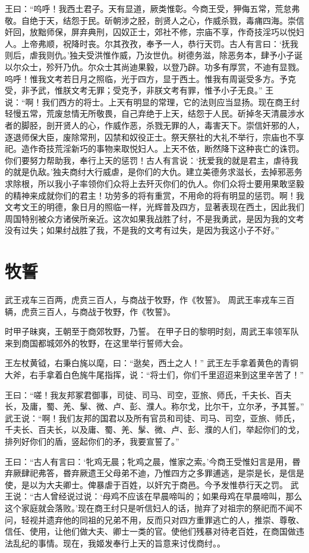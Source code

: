 \documentclass[12pt,UTF8]{ctexbook}
\begin{document}
王曰：“呜呼！我西土君子。天有显道，厥类惟彰。今商王受，狎侮五常，荒怠弗敬。自绝于天，结怨于民。斫朝涉之胫，剖贤人之心，作威杀戮，毒痡四海。崇信奸回，放黜师保，屏弃典刑，囚奴正士，郊社不修，宗庙不享，作奇技淫巧以悦妇人。上帝弗顺，祝降时丧。尔其孜孜，奉予一人，恭行天罚。古人有言曰：‘抚我则后，虐我则仇。’独夫受洪惟作威，乃汝世仇。树德务滋，除恶务本，肆予小子诞以尔众士，殄歼乃仇。尔众士其尚迪果毅，以登乃辟。功多有厚赏，不迪有显戮。呜呼！惟我文考若日月之照临，光于四方，显于西土。惟我有周诞受多方。予克受，非予武，惟朕文考无罪；受克予，非朕文考有罪，惟予小子无良。”
王说：“啊！我们西方的将士。上天有明显的常理，它的法则应当显扬。现在商王纣轻慢五常，荒废怠情无所敬畏，自己弃绝于上天，结怨于人民。斫掉冬天清晨涉水者的脚胫，剖开贤人的心，作威作恶，杀戮无罪的人，毒害天下。崇信奸邪的人，逐退师保大臣，废除常刑，囚禁和奴役正士。祭天祭社的大礼不举行，宗庙也不享祀。造作奇技荒淫新巧的事物来取悦妇人。上天不依，断然降下这种丧亡的诛罚。你们要努力帮助我，奉行上天的惩罚！古人有言说：‘抚爱我的就是君主，虐待我的就是仇敌。’独夫商纣大行威虐，是你们的大仇。建立美德务求滋长，去掉邪恶务求除根，所以我小子率领你们众将上去歼灭你们的仇人。你们众将士要用果敢坚毅的精神来成就你们的君主！功劳多的将有重赏，不用命的将有明显的惩罚。啊！我文考文王的明德，象日月的照临一样，光辉普及四方，显著表现在西土，因此我们周国特别被众方诸侯所亲近。这次如果我战胜了纣，不是我勇武，是因为我的文考没有过失；如果纣战胜了我，不是我的文考有过失，是因为我这小子不好。”

\chapter{牧誓}

武王戎车三百两，虎贲三百人，与商战于牧野，作《牧誓》。
周武王率戎车三百辆，虎贲三百人，与商战于牧野，作《牧誓》。

时甲子昧爽，王朝至于商郊牧野，乃誓。
在甲子日的黎明时刻，周武王率领军队来到商国都城郊外的牧野，在这里举行誓师大会。

王左杖黄钺，右秉白旄以麾，曰：“逖矣，西土之人！”
武王左手拿着黄色的青铜大斧，右手拿着白色旄牛尾指挥，说：“将士们，你们千里迢迢来到这里辛苦了！”

王曰：“嗟！我友邦冢君御事，司徒、司马、司空，亚旅、师氏，千夫长、百夫长，及庸，蜀、羌、髳、微、卢、彭、濮人。称尔戈，比尔干，立尔矛，予其誓。”
武王说：“啊！我们友邦的国君以及所有官员和司徒、司马、司空，亚旅、师氏，千夫长、百夫长，以及庸、蜀、羌、髳、微、卢、彭、濮的人们，举起你们的戈，排列好你们的盾，竖起你们的矛，我要宣誓了。”

王曰：“古人有言曰：‘牝鸡无晨；牝鸡之晨，惟家之索。’今商王受惟妇言是用，昬弃厥肆祀弗答，昬弃厥遗王父母弟不迪，乃惟四方之多罪逋逃，是崇是长，是信是使，是以为大夫卿士。俾暴虐于百姓，以奸宄于商邑。今予发惟恭行天之罚。
武王说：“古人曾经说过说：‘母鸡不应该在早晨啼叫的；如果母鸡在早晨啼叫，那么这个家庭就会落败。’现在商王纣只是听信妇人的话，抛弃了对祖宗的祭祀而不闻不问，轻视并遗弃他的同祖的兄弟不用，反而只对四方重罪逃亡的人，推崇、尊敬、信任、使用，让他们做大夫、卿士一类的官。使他们残暴对待老百姓，在商国做违法乱纪的事情。现在，我姬发奉行上天的旨意来讨伐商纣。。
\end{document}

